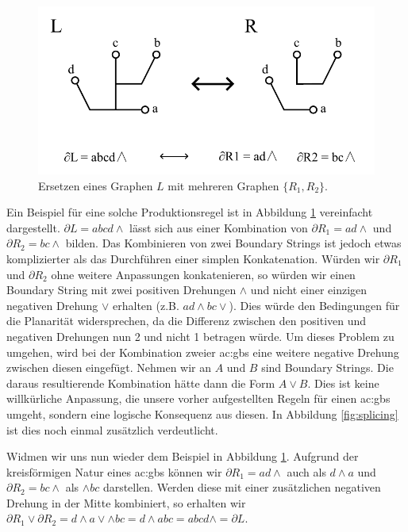 \begin{figure}[t]
    \centering
    \includegraphics[width=(\imgWidth*3/4)]{images/set_of_graphs.pdf}
    \caption{Ersetzen eines Graphen \(L\) mit mehreren Graphen \(\{R_1,R_2\}\).}
    \label{fig:set_of_graphs}
\end{figure}

Ein Beispiel für eine solche Produktionsregel ist in Abbildung \ref{fig:set_of_graphs} vereinfacht dargestellt. \(\partial L = abcd\wedge\) lässt sich aus
einer Kombination von \(\partial R_1 = ad\wedge\) und \(\partial R_2 = bc\wedge\) bilden. Das Kombinieren von zwei Boundary Strings ist jedoch etwas komplizierter
als das Durchführen einer simplen Konkatenation. Würden wir \(\partial R_1\) und \(\partial R_2\) ohne weitere Anpassungen konkatenieren, so würden wir
einen Boundary String mit zwei positiven Drehungen \(\wedge\) und nicht einer einzigen negativen Drehung \(\vee\) erhalten (z.B. \(a d \wedge b c \vee\)).
Dies würde den Bedingungen für die Planarität widersprechen, da die Differenz zwischen den positiven und negativen Drehungen nun 2 und nicht 1 betragen würde.
Um dieses Problem zu umgehen, wird bei der Kombination zweier \gls{ac:gbs} eine weitere negative Drehung zwischen diesen eingefügt. Nehmen wir an \(A\)
und \(B\) sind Boundary Strings. Die daraus resultierende Kombination hätte dann die Form \(A \vee B\). Dies ist keine willkürliche Anpassung, die
unsere vorher aufgestellten Regeln für einen \gls{ac:gbs} umgeht, sondern eine logische Konsequenz aus diesen. In Abbildung \ref{fig:splicing} ist dies noch einmal
zusätzlich verdeutlicht.

Widmen wir uns nun wieder dem Beispiel in Abbildung \ref{fig:set_of_graphs}. Aufgrund der kreisförmigen Natur eines \gls{ac:gbs} können wir
\(\partial R_1 = ad\wedge\) auch als \(d\wedge a\) und \(\partial R_2 = bc\wedge\) als \(\wedge bc\) darstellen. Werden diese mit einer zusätzlichen
negativen Drehung in der Mitte kombiniert, so erhalten wir \(\partial R_1 \vee \partial R_2 = d\wedge a\vee \wedge bc = d\wedge abc = abcd\wedge = \partial L\).


